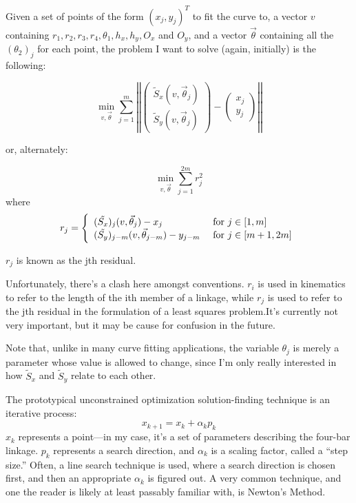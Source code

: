 \documentclass[12pt, letterpaper]{article}
\begin{document}
Given a set of points of the form \((x_j,y_j)^T\) to fit the curve to, a vector \(v\) containing \(r_1,r_2,r_3,r_4,\theta_1,h_x,h_y,O_x\) and \(O_y\), and a vector \(\vec{\theta}\) containing all the \((\theta_2)_j\) for each point, the problem I want to solve (again, initially) is the following:

\[\min_{v,\vec{\theta}}\sum_{j=1}^m\left|\left|\begin{pmatrix}\tilde{S}_x(v,\vec{\theta}_j)\\ \tilde{S}_y(v,\vec{\theta}_j)\end{pmatrix}-\begin{pmatrix}x_j\\y_j\end{pmatrix}\right|\right|\]

or, alternately:

\[\min_{v,\vec{\theta}}\sum_{j=1}^{2m}r_j^2\]
where
\[r_j=\left\{\begin{array}{l l}
(\tilde{S_x})_j(v,\vec{\theta}_j)-x_j & \text{ for } j \in [1,m]\\
(\tilde{S_y})_{j-m}(v,\vec{\theta}_{j-m})-y_{j-m} & \text{ for } j \in [m+1,2m]\end{array}\right.\]

\(r_j\) is known as the jth residual.

Unfortunately, there's a clash here amongst conventions.  \(r_i\) is used in kinematics to refer to the length of the ith member of a linkage, while \(r_j\) is used to refer to the jth residual in the formulation of a least squares problem.It's currently not very important, but it may be cause for confusion in the future.

Note that, unlike in many curve fitting applications, the variable \(\theta_j\) is merely a parameter whose value is allowed to change, since I'm only really interested in how \(\tilde{S}_x\) and \(\tilde{S}_y\) relate to each other.

The prototypical unconstrained optimization solution-finding technique is an iterative process:
\[x_{k+1}=x_k+\alpha_kp_k\]
\(x_k\) represents a point---in my case, it's a set of parameters describing the four-bar linkage.  \(p_k\) represents a search direction, and \(\alpha_k\) is a scaling factor, called a ``step size.'' Often, a line search technique is used, where a search direction is chosen first, and then an appropriate \(\alpha_k\) is figured out. A very common technique, and one the reader is likely at least passably familiar with, is Newton's Method. 
\end{document}
